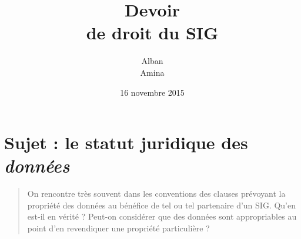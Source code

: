 \documentclass[10pt,a4paper,twoside,onecolumn]{article}
\title{Devoir\\de droit du SIG}
\author{Alban \bsc{Kraus}\\Amina \bsc{Aiache}}
\date{16 novembre 2015}
\begin{document}
\maketitle

\section*{Sujet : le statut juridique des \emph{données}}

\begin{quotation}
  On rencontre très souvent dans les conventions des clauses prévoyant
  la propriété des données au bénéfice de tel ou tel partenaire d'un
  SIG. Qu'en est-il en vérité ? Peut-on considérer que des données
  sont appropriables au point d'en revendiquer une propriété
  particulière ?
\end{quotation}


\end{document}
